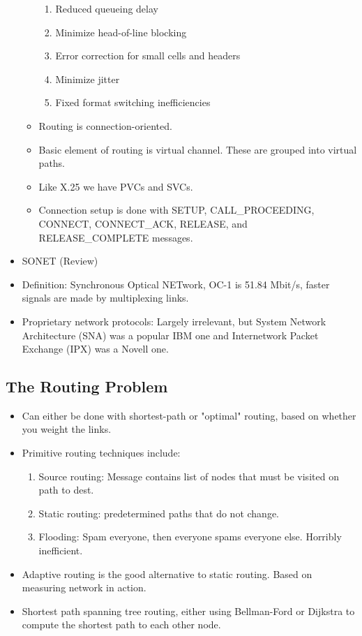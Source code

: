 \documentclass{scrartcl}
\begin{document}
\begin{itemize}
\begin{itemize}
\begin{enumerate}
\item Reduced queueing delay
\item Minimize head-of-line blocking
\item Error correction for small cells and headers
\item Minimize jitter
\item Fixed format switching inefficiencies
\end{enumerate}
\item Routing is connection-oriented.
\item Basic element of routing is virtual channel. These are grouped into
virtual paths.
\item Like X.25 we have PVCs and SVCs.
\item Connection setup is done with SETUP, CALL\_PROCEEDING, CONNECT,
CONNECT\_ACK, RELEASE, and RELEASE\_COMPLETE messages.
\end{itemize}
\item SONET (Review)
\item Definition: Synchronous Optical NETwork, OC-1 is 51.84 Mbit/s, faster
signals are made by multiplexing links.
\item Proprietary network protocols: Largely irrelevant, but
System Network Architecture (SNA) was a popular IBM one and
Internetwork Packet Exchange (IPX) was a Novell one.
\end{itemize}
\subsection*{The Routing Problem}
\begin{itemize}
\item Can either be done with shortest-path or "optimal" routing,
based on whether you weight the links.
\item Primitive routing techniques include:
\begin{enumerate}
\item Source routing: Message contains list of nodes that must be visited
 on path to dest.
\item Static routing: predetermined paths that do not change.
\item Flooding: Spam everyone, then everyone spams everyone else. Horribly
inefficient.
\end{enumerate}
\item Adaptive routing is the good alternative to static routing. Based on
 measuring network in action.
\item Shortest path spanning tree routing, either using Bellman-Ford or
Dijkstra to compute the shortest path to each other node.
\end{itemize}
\end{document}
